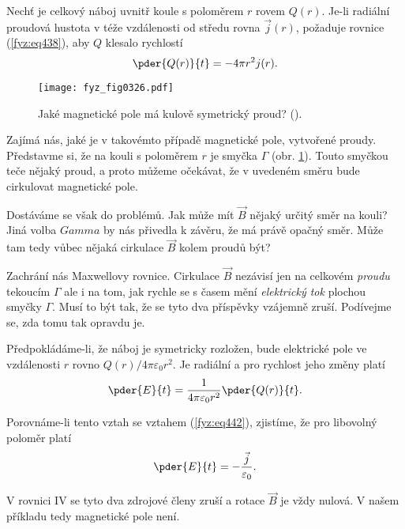   Nechť je celkový náboj uvnitř koule s poloměrem \(r\) rovem \(Q(r)\). Je-li radiální proudová 
  hustota v téže vzdálenosti od středu rovna \(\vec{j}(r)\), požaduje rovnice (\ref{fyz:eq438}), 
  aby \(Q\) klesalo rychlostí
  \begin{equation}\label{fyz:eq442}
    \pder{Q(r)}{t} = - 4\pi r^2j(r).
  \end{equation}
  
  \begin{figure}[ht!]  %
    \centering
    \texttt{[image: fyz\_fig0326.pdf]}
    \caption{Jaké magnetické pole má kulově symetrický proud?
             (\cite[s.~320]{Feynman02}).}
    \label{fyz:fig0326}
  \end{figure}
  
  Zajímá nás, jaké je v takovémto případě magnetické pole, vytvořené proudy. Představme si, že na 
  kouli s poloměrem \(r\) je smyčka \(\Gamma\) (obr. \ref{fyz:fig0326}). Touto smyčkou teče nějaký 
  proud, a proto můžeme očekávat, že v uvedeném směru bude cirkulovat magnetické pole.
  
  Dostáváme se však do problémů. Jak může mít \(\vec{B}\) nějaký určitý směr na kouli? Jiná volba 
  \(Gamma\) by nás přivedla k závěru, že má právě opačný směr. Může tam tedy vůbec nějaká cirkulace 
  \(\vec{B}\) kolem proudů být?
  
  Zachrání nás Maxwellovy rovnice. Cirkulace \(\vec{B}\) nezávisí jen na celkovém \emph{proudu} 
  tekoucím \(\Gamma\) ale i na tom, jak rychle se s časem mění \emph{elektrický tok} plochou smyčky 
  \(\Gamma\). Musí to být tak, že se tyto dva příspěvky vzájemně zruší. Podívejme se, zda tomu tak 
  opravdu je. 
  
  Předpokládáme-li, že náboj je symetricky rozložen, bude elektrické pole ve vzdálenosti \(r\) 
  rovno \(Q(r)/4\pi\varepsilon_0 r^2\). Je radiální a pro rychlost jeho změny platí
  \begin{equation}\label{fyz:eq443}
    \pder{E}{t} =  \frac{1}{4\pi\varepsilon_0 r^2}\pder{Q(r)}{t}.
  \end{equation}
  
  Porovnáme-li tento vztah se vztahem (\ref{fyz:eq442}), zjistíme, že pro libovolný poloměr platí
  \begin{equation}\label{fyz:eq444}
    \pder{E}{t} =  -\frac{\vec{j}}{\varepsilon_0}.
  \end{equation}
  
  V rovnici IV se tyto dva zdrojové členy zruší a rotace \(\vec{B}\) je vždy nulová. V našem 
  příkladu tedy magnetické pole není.
  
